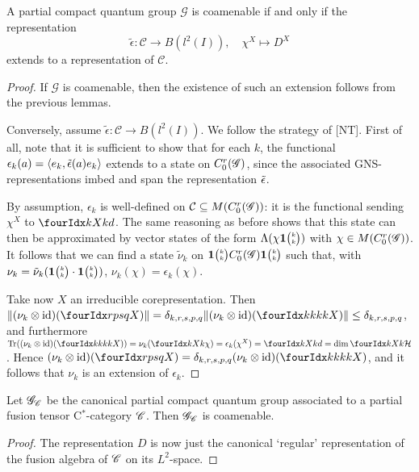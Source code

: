 
\begin{Theorem} A partial compact quantum group $\mathscr{G}$ is coamenable if and only if the representation \[\tilde{\epsilon}: \mathscr{C} \rightarrow B(l^2(I)), \quad \chi^X \mapsto D^X\] extends to a representation of $\mathcal{C}$.
\end{Theorem}

\begin{proof} If $\mathscr{G}$ is coamenable, then the existence of such an extension follows from the previous lemmas. 

Conversely, assume $\tilde{\epsilon}:\mathcal{C}\rightarrow B(l^2(I))$. We follow the strategy of [NT]. First of all, note that it is sufficient to show that for each $k$, the functional $\epsilon_k(a) = \langle e_k,\operatorname{\tilde{\epsilon}}(a)e_k\rangle$ extends to a state on $C^{r}_{0}(\mathscr{G})$, since the associated GNS-representations imbed and span the representation $\operatorname{\tilde{\epsilon}}$. 

By assumption, $\epsilon_k$ is well-defined on $\mathcal{C}\subseteq M(C^{r}_{0}(\mathscr{G}))$: it is the functional sending $\chi^X$ to $\Gr{d}{}{X}{k}{k}$. The same reasoning as before shows that this state can then be approximated by vector states of the form $\Lambda(\chi \mathbf{1}{\tiny {\begin{pmatrix} k\\k\end{pmatrix}}})$ with $\chi\in M(C^{r}_{0}(\mathscr{G}))$. It follows that we can find a state $\tilde{\nu}_k$ on $\mathbf{1}{\tiny {\begin{pmatrix} k\\k\end{pmatrix}}}C^{r}_{0}(\mathscr{G})\mathbf{1}{\tiny {\begin{pmatrix} k\\k\end{pmatrix}}}$ such that, with $\nu_k = \tilde{\nu}_k(\mathbf{1}{\tiny {\begin{pmatrix} k\\k\end{pmatrix}}}\cdot \mathbf{1}{\tiny {\begin{pmatrix} k\\k\end{pmatrix}}})$, $\nu_k(\chi) = \epsilon_k(\chi)$. 

Take now $X$ an irreducible corepresentation. Then $\|(\nu_k\otimes \id)(\Gr{X}{r}{s}{p}{q})\| = \delta_{k,r,s,p,q} \|(\nu_k\otimes \id)(\Gr{X}{k}{k}{k}{k})\| \leq \delta_{k,r,s,p,q}$, and furthermore $\Tr( (\nu_k\otimes \id)(\Gr{X}{k}{k}{k}{k})) = \nu_k(\Gr{\chi}{}{X}{k}{k}) = \epsilon_k(\chi^X) = \Gr{d}{}{X}{k}{k} = \dim \Gr{\Hsp}{}{X}{k}{k}$. Hence $ (\nu_k\otimes \id)(\Gr{X}{r}{s}{p}{q}) = \delta_{k,r,s,p,q} (\nu_k\otimes \id)(\Gr{X}{k}{k}{k}{k})$, and it follows that $\nu_k$ is an extension of $\epsilon_k$. 
\end{proof}  
 
 \begin{Cor} Let $\mathscr{G}_{\mathscr{C}}$ be the canonical partial compact quantum group associated to a partial fusion tensor C$^*$-category $\mathscr{C}$. Then $\mathscr{G}_{\mathscr{C}}$ is coamenable.  
 \end{Cor}
 \begin{proof} The representation $D$ is now just the canonical `regular' representation of the fusion algebra of $\mathscr{C}$ on its $L^2$-space. 
 \end{proof}
 
